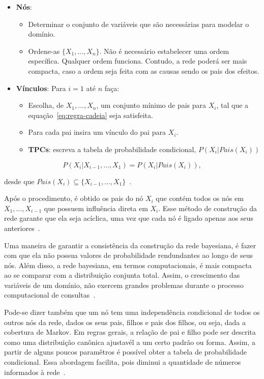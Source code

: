 \begin{itemize}
    \item \textbf{Nós}:
    \begin{itemize}
        \item Determinar o conjunto de variáveis que são necessárias para modelar o domínio.
        \item Ordene-as $\{ X_1, \dots, X_n\}$. Não é necessário estabelecer uma ordem específica. Qualquer ordem funciona. Contudo, a rede poderá ser mais compacta, caso a ordem seja feita com as causas sendo os pais dos efeitos.
    \end{itemize}
    \item \textbf{Vínculos}: Para $i = 1$ até $n$ faça:
    \begin{itemize}
        \item Escolha, de $X_1, \dots, X_n$, um conjunto mínimo de pais para $X_i$, tal que a equação~\ref{eq:regra-cadeia} seja satisfeita.
        \item Para cada pai insira um vínculo do pai para $X_i$.
        \item \textbf{TPCs}: escreva a tabela de probabilidade condicional, $P(X_i|Pais(X_i))$
    \end{itemize}
\end{itemize}

\begin{equation}
    \label{eq:regra-cadeia}
    P(X_i|X_{i-1},\dots,X_1) = P(X_i|Pais(X_i)),
\end{equation}

desde que $Pais(X_i) \subseteq \{X_{i-1},\dots,X_1\}$~\cite{russell:2002}.

Após o procedimento, é obtido os pais do nó $X_i$ que contém todos os nós em $X_1, \dots, X_{i-1}$ que possuem influência direta em $X_i$. Esse método de construção da rede garante que ela seja acíclica, uma vez que cada nó é ligado apenas aos seus anteriores~\cite{russell:2002}.

Uma maneira de garantir a consistência da construção da rede bayesiana, é fazer com que ela não possua valores de probabilidade rendundantes ao longo de seus nós. Além disso, a rede bayesiana, em termos computacionais, é mais compacta ao se comparar com a distribuição conjunta total. Assim, o crescimento das variáveis de um domínio, não exercem grandes problemas durante o processo computacional de consultas~\cite{russell:2002, faceli:2011}.

Pode-se dizer também que um nó tem uma independência condicional de todos os outros nós da rede, dados os seus pais, filhos e pais dos filhos, ou seja, dada a cobertura de Markov. Em regras gerais, a relação de pai e filho pode ser descrita como uma distribuição canônica ajustavél a um certo padrão ou forma. Assim, a partir de alguns poucos paramêtros é possível obter a tabela de probabilidade condicional. Essa abordagem facilita, pois diminui a quantidade de números informados à rede~\cite{russell:2002}.

